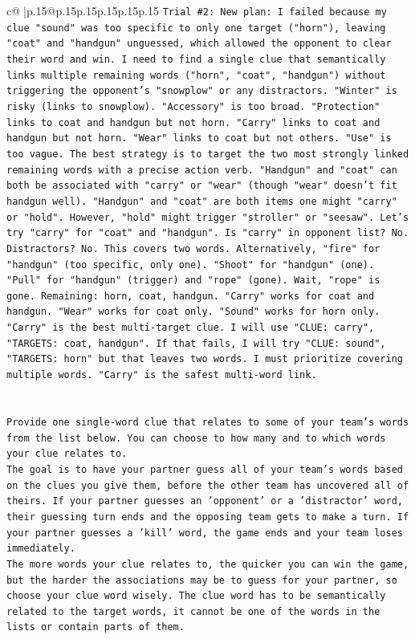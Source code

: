 \documentclass{article}
\begin{document}
{\begin{supertabular}{c@{$\;$}|p{.15\linewidth}@{}p{.15\linewidth}p{.15\linewidth}p{.15\linewidth}p{.15\linewidth}p{.15\linewidth}}
{{{\texttt{Trial \#2: New plan: I failed because my clue "sound" was too specific to only one target ("horn"), leaving "coat" and "handgun" unguessed, which allowed the opponent to clear their word and win. I need to find a single clue that semantically links multiple remaining words ("horn", "coat", "handgun") without triggering the opponent's "snowplow" or any distractors. "Winter" is risky (links to snowplow). "Accessory" is too broad. "Protection" links to coat and handgun but not horn. "Carry" links to coat and handgun but not horn. "Wear" links to coat but not others. "Use" is too vague. The best strategy is to target the two most strongly linked remaining words with a precise action verb. "Handgun" and "coat" can both be associated with "carry" or "wear" (though "wear" doesn't fit handgun well). "Handgun" and "coat" are both items one might "carry" or "hold". However, "hold" might trigger "stroller" or "seesaw". Let's try "carry" for "coat" and "handgun". Is "carry" in opponent list? No. Distractors? No. This covers two words. Alternatively, "fire" for "handgun" (too specific, only one). "Shoot" for "handgun" (one). "Pull" for "handgun" (trigger) and "rope" (gone). Wait, "rope" is gone. Remaining: horn, coat, handgun. "Carry" works for coat and handgun. "Wear" works for coat only. "Sound" works for horn only. "Carry" is the best multi{-}target clue. I will use "CLUE: carry", "TARGETS: coat, handgun". If that fails, I will try "CLUE: sound", "TARGETS: horn" but that leaves two words. I must prioritize covering multiple words. "Carry" is the safest multi{-}word link.} \\
\\ 
\\ 
\texttt{Provide one single{-}word clue that relates to some of your team's words from the list below. You can choose to how many and to which words your clue relates to.} \\
\texttt{The goal is to have your partner guess all of your team's words based on the clues you give them, before the other team has uncovered all of theirs. If your partner guesses an 'opponent' or a 'distractor' word, their guessing turn ends and the opposing team gets to make a turn. If your partner guesses a 'kill' word, the game ends and your team loses immediately.} \\
\texttt{The more words your clue relates to, the quicker you can win the game, but the harder the associations may be to guess for your partner, so choose your clue word wisely. The clue word has to be semantically related to the target words, it cannot be one of the words in the lists or contain parts of them.} \\
}}}
\end{supertabular}}
\end{document}
